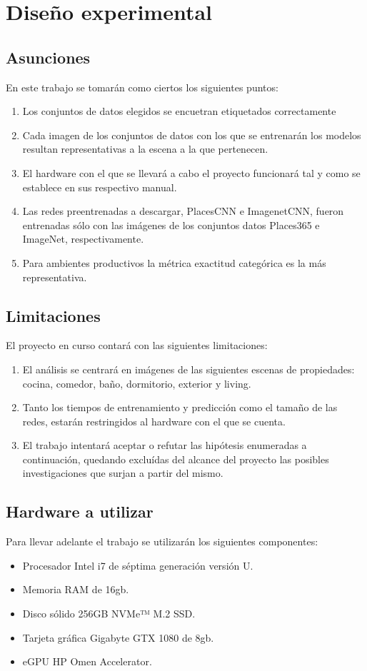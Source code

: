\section{Diseño experimental}
\subsection{Asunciones}
En este trabajo se tomarán como ciertos los siguientes puntos:
\begin{enumerate}
	\item Los conjuntos de datos elegidos se encuetran etiquetados correctamente 
	\item Cada imagen de los conjuntos de datos con los que se entrenarán los modelos resultan representativas a la escena a la que pertenecen.
	\item El hardware con el que se llevará a cabo el proyecto funcionará tal y como se establece en sus respectivo manual.
	\item Las redes preentrenadas a descargar, PlacesCNN e ImagenetCNN, fueron entrenadas sólo con las imágenes de los conjuntos datos Places365 e ImageNet, respectivamente.
	\item Para ambientes productivos la métrica exactitud categórica \cite{balanced_accuracy_score} es la más representativa.
\end{enumerate}

\subsection{Limitaciones} \label{ssec:limitaciones}
El proyecto en curso contará con las siguientes limitaciones:
\begin{enumerate}
	\item El análisis se centrará en imágenes de las siguientes escenas de propiedades: cocina, comedor, baño, dormitorio, exterior y living.
	\item Tanto los tiempos de entrenamiento y predicción como el tamaño de las redes, estarán restringidos al hardware con el que se cuenta.
	\item El trabajo intentará aceptar o refutar las hipótesis enumeradas a continuación, quedando excluídas del alcance del proyecto las posibles investigaciones que surjan a partir del mismo.
\end{enumerate}

\subsection{Hardware a utilizar} \label{ssec:hardware}
Para llevar adelante el trabajo se utilizarán los siguientes componentes:
\begin{itemize}
	\item Procesador Intel i7 de séptima generación versión U.
	\item Memoria RAM de 16gb.
	\item Disco sólido 256GB NVMe™ M.2 SSD.
	\item Tarjeta gráfica Gigabyte GTX 1080 de 8gb.
	\item eGPU HP Omen Accelerator.
\end{itemize}


